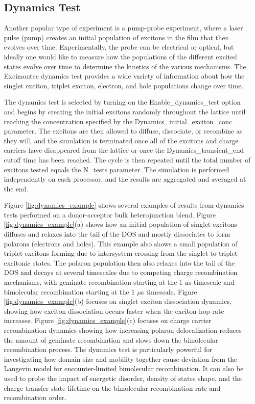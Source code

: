 \documentclass[%
 reprint,onecolumn,notitlepage,
superscriptaddress,longbibliography,
 amsmath,amssymb,
 aps,rmp,floatfix,
]{revtex4-1}
\begin{document}
\subsection{Dynamics Test}

Another popular type of experiment is a pump-probe experiment, where a laser pulse (pump) creates an initial population of excitons in the film that then evolves over time.
Experimentally, the probe can be electrical or optical, but ideally one would like to measure how the populations of the different excited states evolve over time to determine the kinetics of the various mechanisms.
The Excimontec dynamics test provides a wide variety of information about how the singlet exciton, triplet exciton, electron, and hole populations change over time.

The dynamics test is selected by turning on the Enable\_dynamics\_test option and begins by creating the initial excitons randomly throughout the lattice until reaching the concentration specified by the Dynamics\_initial\_exciton\_conc parameter.
The excitons are then allowed to diffuse, dissociate, or recombine as they will, and the simulation is terminated once all of the excitons and charge carriers have disappeared from the lattice or once the Dynamics\_transient\_end cutoff time has been reached.
The cycle is then repeated until the total number of excitons tested equals the N\_tests parameter.
The simulation is performed independently on each processor, and the results are aggregated and averaged at the end.

Figure \ref{fig:dynamics_example} shows several examples of results from dynamics tests performed on a donor-acceptor bulk heterojunction blend.
Figure \ref{fig:dynamics_example}(a) shows how an initial population of singlet excitons diffuses and relaxes into the tail of the DOS and mostly dissociates to form polarons (electrons and holes).
This example also shows a small population of triplet excitons forming due to intersystem crossing from the singlet to triplet excitonic states.
The polaron population then also relaxes into the tail of the DOS and decays at several timescales due to competing charge recombination mechanisms, with geminate recombination starting at the 1 ns timescale and bimolecular recombination starting at the 1 $\mu$s timescale.
Figure \ref{fig:dynamics_example}(b) focuses on singlet exciton dissociation dynamics, showing how exciton dissociation occurs faster when the exciton hop rate increases.
Figure \ref{fig:dynamics_example}(c) focuses on charge carrier recombination dynamics showing how increasing polaron delocalization reduces the amount of geminate recombination and slows down the bimolecular recombination process.
The dynamics test is particularly powerful for investigating how domain size and mobility together cause deviation from the Langevin model for encounter-limited bimolecular recombination.\cite{heiber2015prl,heiber2016prb}
It can also be used to probe the impact of energetic disorder, density of states shape, and the charge-transfer state lifetime on the bimolecular recombination rate and recombination order.\cite{coropceanu2017jpcc}
\end{document}
